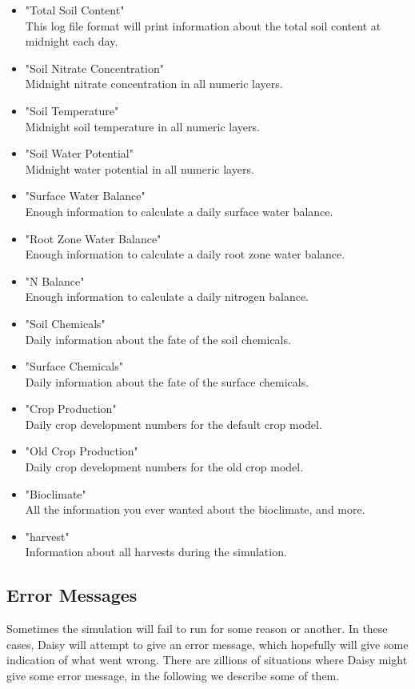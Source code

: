 \begin{itemize}
\item "Total Soil Content"\\
  This log file format will print information about the total soil
  content at midnight each day. 
\item "Soil Nitrate Concentration"\\
  Midnight nitrate concentration in all numeric layers.
\item "Soil Temperature"\\
  Midnight soil temperature in all numeric layers.
\item "Soil Water Potential"\\
  Midnight water potential in all numeric layers.
\item "Surface Water Balance"\\
  Enough information to calculate a daily surface water balance. 
\item "Root Zone Water Balance"\\
  Enough information to calculate a daily root zone water balance. 
\item "N Balance"\\
  Enough information to calculate a daily nitrogen balance. 
\item "Soil Chemicals"\\
  Daily information about the fate of the soil chemicals.
\item "Surface Chemicals"\\
  Daily information about the fate of the surface chemicals.
\item "Crop Production"\\
  Daily crop development numbers for the default crop model.
\item "Old Crop Production"\\
  Daily crop development numbers for the old crop model.
\item "Bioclimate"\\
  All the information you ever wanted about the bioclimate, and more. 
\item "harvest"\\
  Information about all harvests during the simulation. 
\end{itemize}

\subsection{Error Messages}

Sometimes the simulation will fail to run for some reason or another.
In these cases, Daisy will attempt to give an error message, which
hopefully will give some indication of what went wrong.  There are
zillions of situations where Daisy might give some error message, in
the following we describe some of them.

